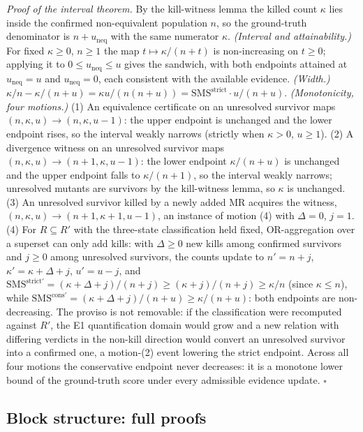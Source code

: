 \documentclass[manuscript,screen,review]{acmart}
\begin{document}
\emph{Proof of the interval theorem.} By the kill-witness lemma the
killed count $\kappa$ lies inside the confirmed non-equivalent
population $n$, so the ground-truth denominator is
$n + u_{\mathrm{neq}}$ with the same numerator $\kappa$.
\emph{(Interval and attainability.)} For fixed $\kappa \geq 0$,
$n \geq 1$ the map $t \mapsto \kappa/(n+t)$ is non-increasing on
$t \geq 0$; applying it to $0 \leq u_{\mathrm{neq}} \leq u$ gives the
sandwich, with both endpoints attained at $u_{\mathrm{neq}} = u$ and
$u_{\mathrm{neq}} = 0$, each consistent with the available evidence.
\emph{(Width.)}
$\kappa/n - \kappa/(n+u) = \kappa u/(n(n+u)) = \mathrm{SMS}^{\mathrm{strict}} \cdot u/(n+u)$.
\emph{(Monotonicity, four motions.)} (1) An equivalence certificate on
an unresolved survivor maps $(n, \kappa, u) \to (n, \kappa, u-1)$: the
upper endpoint is unchanged and the lower endpoint rises, so the
interval weakly narrows (strictly when $\kappa > 0$, $u \geq 1$). (2) A
divergence witness on an unresolved survivor maps
$(n, \kappa, u) \to (n+1, \kappa, u-1)$: the lower endpoint
$\kappa/(n+u)$ is unchanged and the upper endpoint falls to
$\kappa/(n+1)$, so the interval weakly narrows; unresolved mutants are
survivors by the kill-witness lemma, so $\kappa$ is unchanged. (3) An
unresolved survivor killed by a newly added MR acquires the witness,
$(n, \kappa, u) \to (n+1, \kappa+1, u-1)$, an instance of motion (4)
with $\Delta = 0$, $j = 1$. (4) For $R \subseteq R'$ with the
three-state classification held fixed, OR-aggregation over a superset
can only add kills: with $\Delta \geq 0$ new kills among confirmed
survivors and $j \geq 0$ among unresolved survivors, the counts update
to $n' = n + j$, $\kappa' = \kappa + \Delta + j$, $u' = u - j$, and
$\mathrm{SMS}^{\mathrm{strict}\prime} = (\kappa+\Delta+j)/(n+j) \geq (\kappa+j)/(n+j) \geq \kappa/n$
(since $\kappa \leq n$), while
$\mathrm{SMS}^{\mathrm{cons}\prime} = (\kappa+\Delta+j)/(n+u) \geq \kappa/(n+u)$:
both endpoints are non-decreasing. The proviso is not removable: if the
classification were recomputed against $R'$, the E1 quantification
domain would grow and a new relation with differing verdicts in the
non-kill direction would convert an unresolved survivor into a confirmed
one, a motion-(2) event lowering the strict endpoint. Across all four
motions the conservative endpoint never decreases: it is a monotone
lower bound of the ground-truth score under every admissible evidence
update. $\square$

\subsection{Block structure: full proofs}\label{g.7-gap-proofs}
\end{document}
